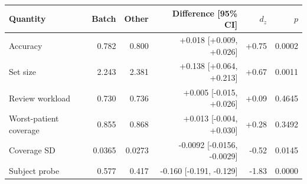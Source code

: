 \begin{tabular}{lrrrrr}
\toprule
Quantity & Batch & Other & Difference [95\% CI] & $d_z$ & $p$ \\
\midrule
Accuracy & 0.782 & 0.800 & +0.018 [+0.009, +0.026] & +0.75 & 0.0002 \\
Set size & 2.243 & 2.381 & +0.138 [+0.064, +0.213] & +0.67 & 0.0011 \\
Review workload & 0.730 & 0.736 & +0.005 [-0.015, +0.026] & +0.09 & 0.4645 \\
Worst-patient coverage & 0.855 & 0.868 & +0.013 [-0.004, +0.030] & +0.28 & 0.3492 \\
Coverage SD & 0.0365 & 0.0273 & -0.0092 [-0.0156, -0.0029] & -0.52 & 0.0145 \\
Subject probe & 0.577 & 0.417 & -0.160 [-0.191, -0.129] & -1.83 & 0.0000 \\
\bottomrule
\end{tabular}